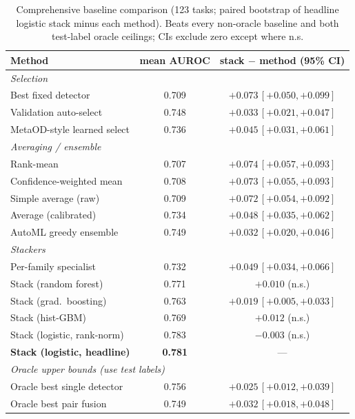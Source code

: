 \documentclass[11pt,titlepage]{article}
\begin{document}
\begin{table}[H]\centering
\caption{Comprehensive baseline comparison (123 tasks; paired bootstrap of headline
logistic stack minus each method). Beats every non-oracle baseline and both
test-label oracle ceilings; CIs exclude zero except where n.s.}
\label{tab:baselines_th}\small
\begin{tabular}{lcc}
\toprule
\textbf{Method} & mean AUROC & stack $-$ method (95\% CI) \\
\midrule
\multicolumn{3}{l}{\emph{Selection}}\\
Best fixed detector & 0.709 & $+0.073\,[+0.050,+0.099]$ \\
Validation auto-select & 0.748 & $+0.033\,[+0.021,+0.047]$ \\
MetaOD-style learned select & 0.736 & $+0.045\,[+0.031,+0.061]$ \\
\multicolumn{3}{l}{\emph{Averaging / ensemble}}\\
Rank-mean & 0.707 & $+0.074\,[+0.057,+0.093]$ \\
Confidence-weighted mean & 0.708 & $+0.073\,[+0.055,+0.093]$ \\
Simple average (raw) & 0.709 & $+0.072\,[+0.054,+0.092]$ \\
Average (calibrated) & 0.734 & $+0.048\,[+0.035,+0.062]$ \\
AutoML greedy ensemble & 0.749 & $+0.032\,[+0.020,+0.046]$ \\
\multicolumn{3}{l}{\emph{Stackers}}\\
Per-family specialist & 0.732 & $+0.049\,[+0.034,+0.066]$ \\
Stack (random forest) & 0.771 & $+0.010$ (n.s.) \\
Stack (grad.\ boosting) & 0.763 & $+0.019\,[+0.005,+0.033]$ \\
Stack (hist-GBM) & 0.769 & $+0.012$ (n.s.) \\
Stack (logistic, rank-norm) & 0.783 & $-0.003$ (n.s.) \\
\textbf{Stack (logistic, headline)} & \textbf{0.781} & --- \\
\multicolumn{3}{l}{\emph{Oracle upper bounds (use test labels)}}\\
Oracle best single detector & 0.756 & $+0.025\,[+0.012,+0.039]$ \\
Oracle best pair fusion & 0.749 & $+0.032\,[+0.018,+0.048]$ \\
\bottomrule
\end{tabular}
\end{table}
\end{document}
